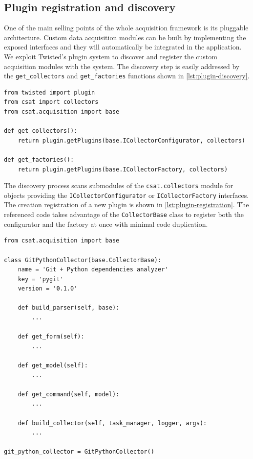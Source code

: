 \subsection{Plugin registration and discovery}

One of the main selling points of the whole acquisition framework is its pluggable architecture. Custom data acquisition modules can be built by implementing the exposed interfaces and they will automatically be integrated in the application. We exploit Twisted's plugin system to discover and register the custom acquisition modules with the system. The discovery step is easily addressed by the \texttt{get\_collectors} and \texttt{get\_factories} functions shown in \vref{lst:plugin-discovery}.

\begin{lstlisting}[caption={Custom acquisition modules discovery.},label=lst:plugin-discovery]
from twisted import plugin
from csat import collectors
from csat.acquisition import base

def get_collectors():
    return plugin.getPlugins(base.ICollectorConfigurator, collectors)

def get_factories():
    return plugin.getPlugins(base.ICollectorFactory, collectors)
\end{lstlisting}

The discovery process scans submodules of the \texttt{csat.collectors} module for objects providing the \texttt{ICollectorConfigurator} or \texttt{ICollectorFactory} interfaces. The creation registration of a new plugin is shown in \vref{lst:plugin-registration}. The referenced code takes advantage of the \texttt{CollectorBase} class to register both the configurator and the factory at once with minimal code duplication.

\begin{lstlisting}[caption={Registration of a custom acquisition module.},label=lst:plugin-registration]
from csat.acquisition import base

class GitPythonCollector(base.CollectorBase):
    name = 'Git + Python dependencies analyzer'
    key = 'pygit'
    version = '0.1.0'

    def build_parser(self, base):
        ...

    def get_form(self):
        ...

    def get_model(self):
        ...

    def get_command(self, model):
        ...

    def build_collector(self, task_manager, logger, args):
        ...

git_python_collector = GitPythonCollector()
\end{lstlisting}

